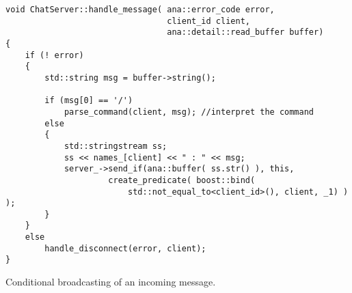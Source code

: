 \documentclass[a4paper,12pt,english]{article}
\begin{document}
\begin{table}[!htb]
\lstset{language=C++}
\begin{lstlisting}[frame=single]
void ChatServer::handle_message( ana::error_code error, 
                                 client_id client, 
                                 ana::detail::read_buffer buffer)
{
    if (! error)
    {
        std::string msg = buffer->string();

        if (msg[0] == '/')
            parse_command(client, msg); //interpret the command
        else
        {
            std::stringstream ss;
            ss << names_[client] << " : " << msg;
            server_->send_if(ana::buffer( ss.str() ), this,
                     create_predicate( boost::bind( 
                         std::not_equal_to<client_id>(), client, _1) ) );
        }
    }
    else
        handle_disconnect(error, client);
}
\end{lstlisting}
\centering \caption{Conditional broadcasting of an incoming message.} 
\label{server-message}
\end{table} 
\end{document}
